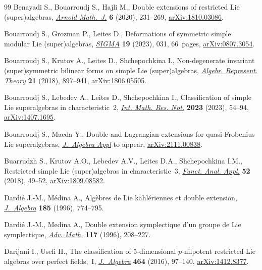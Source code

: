 \documentclass[10pt,a4paper]{amsart}
\numberwithin{equation}{section}
\begin{document}
\begin{thebibliography}{99}
Benayadi S., Bouarroudj S., Hajli M., Double extensions of restricted {L}ie
 (super)algebras, \href{https://doi.org/10.1007/s40598-020-00149-5}{\textit{Arnold Math.~J.}} \textbf{6} (2020), 231--269,
 \href{https://arxiv.org/abs/1810.03086}{arXiv:1810.03086}.

Bouarroudj S., Grozman P., Leites D., Deformations of symmetric simple modular
 {L}ie (super)algebras, \href{https://doi.org/10.3842/SIGMA.2023.031}{\textit{SIGMA}} \textbf{19} (2023), 031, 66~pages,
 \href{https://arxiv.org/abs/0807.3054}{arXiv:0807.3054}.

Bouarroudj S., Krutov A., Leites D., Shchepochkina I., Non-degenerate invariant
 (super)symmetric bilinear forms on simple {L}ie (super)algebras,
 \href{https://doi.org/10.1007/s10468-018-9802-8}{\textit{Algebr. Represent. Theory}} \textbf{21} (2018), 897--941,
 \href{https://arxiv.org/abs/1806.05505}{arXiv:1806.05505}.

Bouarroudj S., Lebedev A., Leites D., Shchepochkina I., Classification of
 simple {L}ie superalgebras in characteristic~2, \href{https://doi.org/10.1093/imrn/rnab265}{\textit{Int. Math. Res. Not.}}
 \textbf{2023} (2023), 54--94, \href{https://arxiv.org/abs/1407.1695}{arXiv:1407.1695}.

Bouarroudj S., Maeda Y., Double and {L}agrangian extensions for
 quasi-{F}robenius {L}ie superalgebras, \href{https://doi.org/10.1142/S0219498824500014}{\textit{J.~Algebra Appl}} {t}o appear,
 \href{https://arxiv.org/abs/2111.00838}{arXiv:2111.00838}.

Buarrudzh S., Krutov A.O., Lebedev A.V., Leites D.A., Shchepochkina I.M.,
 Restricted simple {L}ie (super)algebras in characteristic~3, \href{https://doi.org/10.1007/s10688-018-0206-7}{\textit{Funct.
 Anal. Appl.}} \textbf{52} (2018), 49--52, \href{https://arxiv.org/abs/1809.08582}{arXiv:1809.08582}.

Dardi\'e J.-M., M\'edina A., Alg\`ebres de {L}ie k\"ahl\'eriennes et double
 extension, \href{https://doi.org/10.1006/jabr.1996.0350}{\textit{J.~Algebra}} \textbf{185} (1996), 774--795.

Dardi\'e J.-M., Medina A., Double extension symplectique d'un groupe de {L}ie
 symplectique, \href{https://doi.org/10.1006/aima.1996.0009}{\textit{Adv. Math.}} \textbf{117} (1996), 208--227.

Darijani I., Usefi H., The classification of 5-dimensional {$p$}-nilpotent
 restricted {L}ie algebras over perfect fields,~{I}, \href{https://doi.org/10.1016/j.jalgebra.2016.06.011}{\textit{J.~Algebra}}
 \textbf{464} (2016), 97--140, \href{https://arxiv.org/abs/1412.8377}{arXiv:1412.8377}.


\end{thebibliography}
\end{document}
